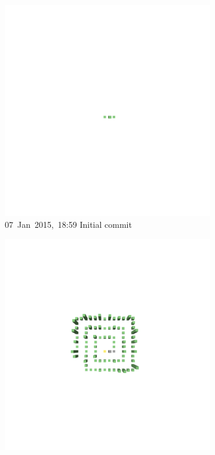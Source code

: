 \begin{figure}[ht]
    \begin{subfigure}{0.32\textwidth}
        \includegraphics[width=\linewidth]{JetUML_V0S1.png}
        \caption{\mbox{07 Jan 2015, 18:59}  \hfill  \linebreak Initial commit} 
        \label{fig:JetUML_V0S1}
    \end{subfigure}
    \hspace*{\fill}
    \begin{subfigure}{0.32\textwidth}
        \includegraphics[width=\linewidth]{JetUML_V0S2.png}

\end{subfigure}
\end{figure}
